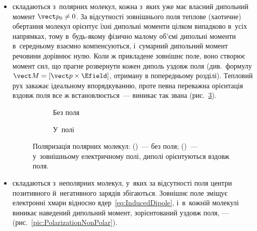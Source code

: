 \begin{itemize}
	\item {} складаються з~полярних молекул, кожна з~яких уже має
	      власний дипольний момент $\vect p_0 \neq 0$. За відсутності зовнішнього поля теплове
	      (хаотичне) обертання молекул орієнтує їхні дипольні моменти цілком випадково в~усіх
	      напрямках, тому в~будь-якому фізично малому об'ємі дипольні моменти в~середньому
	      взаємно компенсуються, і~сумарний дипольний момент речовини дорівнює нулю. Коли ж
	      прикладене зовнішнє поле, воно створює момент сил, що прагне розвернути кожен диполь
	      уздовж поля (див.~формулу $\vect M = [\vect p\times\Efield]$, отриману в
	      попередньому розділі). Тепловий рух заважає ідеальному впорядкуванню, проте певна
	      переважна орієнтація вздовж поля все ж встановлюється~--- виникає так звана
	       (рис.~\ref{pic:PolarizationPolar}).

	      \begin{figure}[h!]
		      \centering
		      \begin{subfigure}[t]{0.48\linewidth}
			      \centering
			      \caption{Без поля}
			      \label{pic:PolarNoField}
		      \end{subfigure}\hfill
		      \begin{subfigure}[t]{0.48\linewidth}
			      \centering
			      \caption{У~полі}
			      \label{pic:PolarField}
		      \end{subfigure}
		      \caption{Поляризація полярних молекул:
		      (\protect{})~--- без поля;
		      (\protect{})~--- у~зовнішньому електричному полі,
		      диполі орієнтуються вздовж поля.}
		      \label{pic:PolarizationPolar}
	      \end{figure}

	\item {} складаються з~неполярних молекул, у~яких за
	      відсутності поля центри позитивного й~негативного зарядів збігаються. Зовнішнє поле
	      зміщує електронні хмари відносно ядер~\eqref{eq:InducedDipole}, і~в~кожній
	      молекулі виникає наведений дипольний момент, зорієнтований уздовж поля, ---
	       (рис.~\ref{pic:PolarizationNonPolar}).


\end{itemize}
